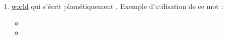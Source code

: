 \begin{enumerate}
\item \href{http://www.wordreference.com/enfr/world}{world} qui s'écrit phonétiquement \href{https://en.oxforddictionaries.com/definition/world}{}. Exemple d'utilisation de
ce mot :

\begin{itemize}
\item{}
\item{}
\end{itemize}

\end{enumerate}

\subsection{}\label{sec:j}

